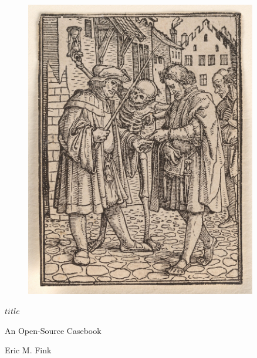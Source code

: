 \color{OffBlack}


{\clearpage}{}

\blankpage

\frontmatter

\thispagestyle{empty}

\begin{figure}
\centering
\includegraphics[width=0.9\textwidth]{../img/holbein-advocate.jpg}
\end{figure}

\clearpage


\thispagestyle{empty}

\begin{flushright}

\vspace*{50mm}

{\bfseries\Huge{$title$}} 

{\bfseries\vspace{5mm}}

{\Large{An Open-Source Casebook}} 

\vspace{20mm}

{\normalsize{Eric M. Fink}} 

\vspace*{\fill}

\begin{small}



\rmfamily{\monthyear} 

\end{small}

\end{flushright}

